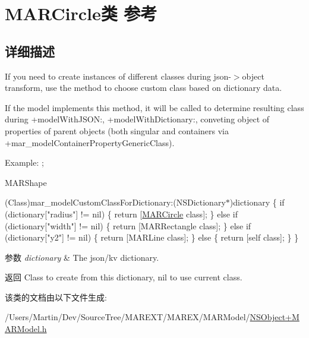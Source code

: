 \hypertarget{class_m_a_r_circle}{}\section{M\+A\+R\+Circle类 参考}
\label{class_m_a_r_circle}


\subsection{详细描述}
If you need to create instances of different classes during json-\/$>$object transform, use the method to choose custom class based on dictionary data.

If the model implements this method, it will be called to determine resulting class during {\ttfamily +model\+With\+J\+S\+ON\+:}, {\ttfamily +model\+With\+Dictionary\+:}, conveting object of properties of parent objects (both singular and containers via {\ttfamily +mar\+\_\+model\+Container\+Property\+Generic\+Class}).

Example\+: ;

M\+A\+R\+Shape


\begin{DoxyItemize}
\item (Class)mar\+\_\+model\+Custom\+Class\+For\+Dictionary\+:(\+N\+S\+Dictionary$\ast$)dictionary \{ if (dictionary\mbox{[}"radius"\mbox{]} != nil) \{ return \mbox{[}\hyperlink{class_m_a_r_circle}{M\+A\+R\+Circle} class\mbox{]}; \} else if (dictionary\mbox{[}"width"\mbox{]} != nil) \{ return \mbox{[}M\+A\+R\+Rectangle class\mbox{]}; \} else if (dictionary\mbox{[}"y2"\mbox{]} != nil) \{ return \mbox{[}M\+A\+R\+Line class\mbox{]}; \} else \{ return \mbox{[}self class\mbox{]}; \} \}
\end{DoxyItemize}


\begin{DoxyParams}{参数}
{\em dictionary} & The json/kv dictionary.\\
\hline
\end{DoxyParams}
\begin{DoxyReturn}{返回}
Class to create from this dictionary, {\ttfamily nil} to use current class. 
\end{DoxyReturn}


该类的文档由以下文件生成\+:\begin{DoxyCompactItemize}
\item 
/\+Users/\+Martin/\+Dev/\+Source\+Tree/\+M\+A\+R\+E\+X\+T/\+M\+A\+R\+E\+X/\+M\+A\+R\+Model/\hyperlink{_n_s_object_09_m_a_r_model_8h}{N\+S\+Object+\+M\+A\+R\+Model.\+h}\end{DoxyCompactItemize}
